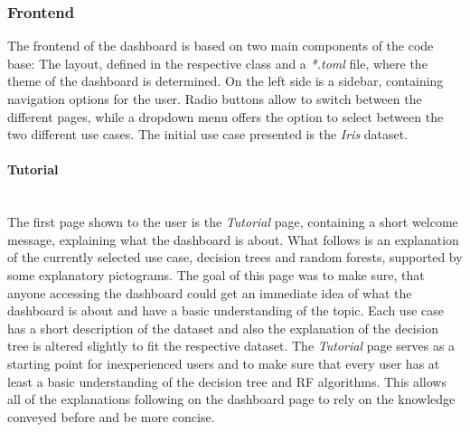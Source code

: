 \documentclass[a4paper, 12pt]{article}
\begin{document}
\subsubsection{Frontend}
The frontend of the dashboard is based on two main components of the code base: The layout, defined
in the respective class and a \textit{*.toml} file, where the theme of the dashboard is determined.
On the left side is a sidebar, containing navigation options for the user. Radio buttons allow to
switch between the different pages, while a dropdown menu offers the option to select between the
two different use cases. The initial use case presented is the \textit{Iris} dataset.

\paragraph{Tutorial}\mbox{}\\
The first page shown to the user is the \textit{Tutorial} page, containing a short welcome message,
explaining what the dashboard is about. What follows is an explanation of the currently selected use
case, decision trees and random forests, supported by some explanatory pictograms.
The goal of this page was to make sure, that anyone accessing the dashboard could get an immediate
idea of what the dashboard is about and have a basic understanding of the topic. Each use case has
a short description of the dataset and also the explanation of the decision tree is altered slightly
to fit the respective dataset. The \textit{Tutorial} page serves as a starting point for
inexperienced users and to make sure that every user has at least a basic understanding of the
decision tree and RF algorithms. This allows all of the explanations following on the dashboard page
to rely on the knowledge conveyed before and be more concise. \par
\end{document}
